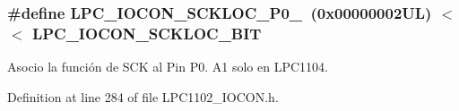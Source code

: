 \subsubsection[{\texorpdfstring{L\+P\+C\+\_\+\+I\+O\+C\+O\+N\+\_\+\+S\+C\+K\+L\+O\+C\+\_\+\+P0\+\_\+6}{LPC_IOCON_SCKLOC_P0_6}}]{\setlength{\rightskip}{0pt plus 5cm}\#define L\+P\+C\+\_\+\+I\+O\+C\+O\+N\+\_\+\+S\+C\+K\+L\+O\+C\+\_\+\+P0\+\_~(0x00000002\+U\+L) $<$$<$ L\+P\+C\+\_\+\+I\+O\+C\+O\+N\+\_\+\+S\+C\+K\+L\+O\+C\+\_\+\+B\+IT}\hypertarget{group___l_p_c___i_o_c_o_n___l_p_c1102___s_c_k___l_o_c_gaa6d2e11946beb81a3e4260e789fe67fe}{}\label{group___l_p_c___i_o_c_o_n___l_p_c1102___s_c_k___l_o_c_gaa6d2e11946beb81a3e4260e789fe67fe}


Asocio la función de S\+CK al Pin P0. A1 solo en L\+P\+C1104. 



Definition at line 284 of file L\+P\+C1102\+\_\+\+I\+O\+C\+O\+N.\+h.

